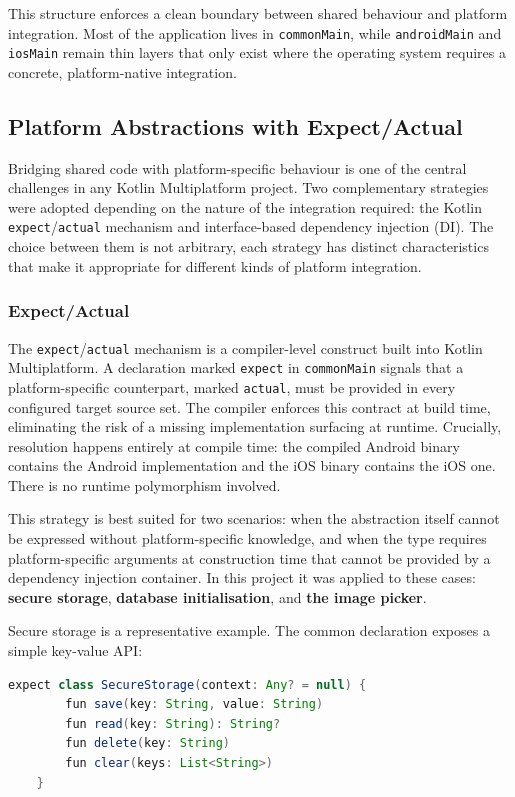 This structure enforces a clean boundary between shared behaviour and platform integration. Most of the application lives in \texttt{commonMain}, while \texttt{androidMain} and \texttt{iosMain} remain thin layers that only exist where the operating system requires a concrete, platform-native integration.

\subsection{Platform Abstractions with Expect/Actual}
\label{subsec:expect-actual}
Bridging shared code with platform-specific behaviour is one of the central challenges in any Kotlin Multiplatform project. 
Two complementary strategies were adopted depending on the nature of the integration required: the Kotlin \texttt{expect}/\texttt{actual} mechanism and interface-based dependency injection (DI). 
The choice between them is not arbitrary, each strategy has distinct characteristics that make it appropriate for different kinds of platform integration.

\subsubsection{Expect/Actual}

The \texttt{expect}/\texttt{actual} mechanism is a compiler-level construct built into Kotlin Multiplatform.
A declaration marked \texttt{expect} in \texttt{commonMain} signals that a platform-specific counterpart, marked \texttt{actual}, must be provided in every configured target source set.
The compiler enforces this contract at build time, eliminating the risk of a missing implementation surfacing at runtime. 
Crucially, resolution happens entirely at compile time: the compiled Android binary contains the Android implementation and the iOS binary contains the iOS one. 
There is no runtime polymorphism involved.

This strategy is best suited for two scenarios: when the abstraction itself cannot be expressed without platform-specific knowledge, and when the type requires platform-specific arguments at construction time that cannot be provided by a dependency injection container.
In this project it was applied to these cases: \textbf{secure storage}, \textbf{database initialisation}, and \textbf{the image picker}.

Secure storage is a representative example. 
The common declaration exposes a simple key-value API:

\begin{lstlisting}[language=java, caption={SecureStorage expect declaration (commonMain)}]
	expect class SecureStorage(context: Any? = null) {
		fun save(key: String, value: String)
		fun read(key: String): String?
		fun delete(key: String)
		fun clear(keys: List<String>)
	}
\end{lstlisting}

